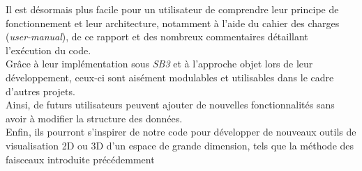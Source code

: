 \documentclass[12pt]{article}
\begin{document}
Il est désormais plus facile pour un utilisateur de comprendre leur principe de fonctionnement et leur architecture, notamment à l'aide du cahier des charges (\emph{user-manual}), de ce rapport et des nombreux commentaires détaillant l'exécution du code. \\

Grâce à leur implémentation sous \emph{SB3} et à l'approche objet lors de leur développement, ceux-ci sont aisément modulables et utilisables dans le cadre d'autres projets. \\

Ainsi, de futurs utilisateurs peuvent ajouter de nouvelles fonctionnalités sans avoir à modifier la structure des données. \\

Enfin, ils pourront s'inspirer de notre code pour développer de nouveaux outils de visualisation 2D ou 3D d'un espace de grande dimension, tels que la méthode des faisceaux introduite précédemment \\
\end{document}
